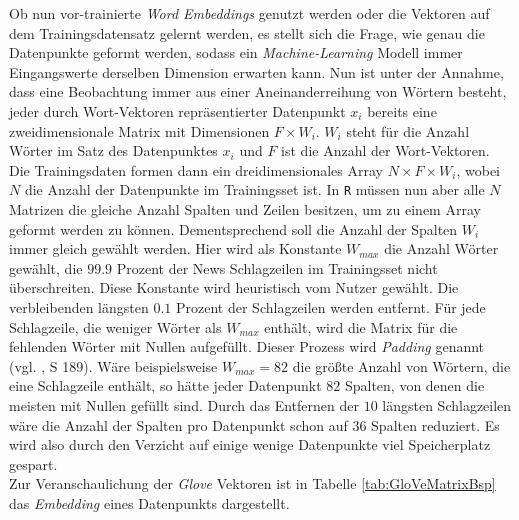 \documentclass[a4paper,11pt]{article}
\begin{document}
Ob nun vor-trainierte \textit{Word Embeddings} genutzt werden oder die Vektoren auf dem Trainingsdatensatz gelernt werden, es stellt sich die Frage, wie genau die Datenpunkte geformt werden, sodass ein \textit{Machine-Learning} Modell immer Eingangswerte derselben Dimension erwarten kann. Nun ist unter der Annahme, dass eine Beobachtung immer aus einer Aneinanderreihung von Wörtern besteht, jeder durch Wort-Vektoren repräsentierter Datenpunkt $x_i$ bereits eine zweidimensionale Matrix mit Dimensionen $F \times  W_i$. $W_i$ steht für die Anzahl Wörter im Satz des Datenpunktes $x_i$ und $F$ ist die Anzahl der Wort-Vektoren. Die Trainingsdaten formen dann ein dreidimensionales Array $N \times F \times  W_i$, wobei $N$ die Anzahl der Datenpunkte im Trainingsset ist. In \texttt{R} müssen nun aber alle $N$ Matrizen die gleiche Anzahl Spalten und Zeilen besitzen, um zu einem Array geformt werden zu können.
Dementsprechend soll die Anzahl der Spalten $W_i$ immer gleich gewählt werden. Hier wird als Konstante $W_{max}$ die Anzahl Wörter gewählt, die $99.9$ Prozent der News Schlagzeilen im Trainingsset nicht überschreiten. Diese Konstante wird heuristisch vom Nutzer gewählt. Die verbleibenden längsten $0.1$ Prozent der Schlagzeilen werden entfernt.
Für jede Schlagzeile, die weniger Wörter als $W_{max}$ enthält, wird die Matrix für die fehlenden Wörter mit Nullen aufgefüllt. Dieser Prozess wird \textit{Padding} genannt (vgl. \cite{keras}, S 189). Wäre beispielsweise $W_{max} = 82$ die größte Anzahl von Wörtern, die eine Schlagzeile enthält, so hätte jeder Datenpunkt $82$ Spalten, von denen die meisten mit Nullen gefüllt sind. Durch das Entfernen der $10$ längsten Schlagzeilen wäre die Anzahl der Spalten pro Datenpunkt schon auf $36$ Spalten reduziert. Es wird also durch den Verzicht auf einige wenige Datenpunkte viel Speicherplatz gespart.\\
Zur Veranschaulichung der \textit{Glove} Vektoren ist in Tabelle \ref{tab:GloVeMatrixBsp} das \textit{Embedding} eines Datenpunkts dargestellt.
\end{document}

